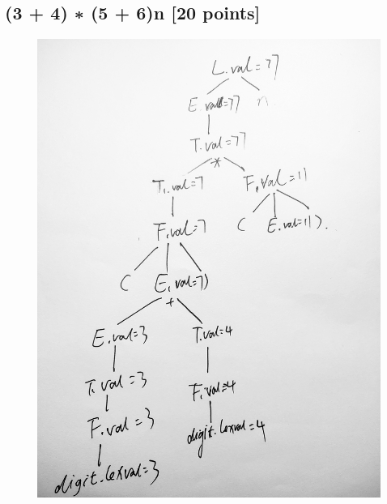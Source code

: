 \documentclass{article}
\begin{document}
        \subsection{(3 + 4) ∗ (5 + 6)n [20 points]}
        \begin{figure}[H]
            \centering
            
            \includegraphics[scale=0.15]{./Q1_1.jpg}
            \label{fig:label}
        \end{figure}
\end{document}

